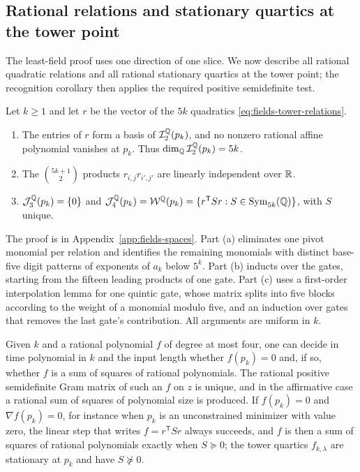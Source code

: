 \subsection{Rational relations and stationary quartics at the tower point}
\label{sec:fields-spaces}

The least-field proof uses one direction of one slice. We now describe all
rational quadratic relations and all rational stationary quartics at the
tower point; the recognition corollary then applies the required positive
semidefinite test.

\begin{theorem}
\label{thm:fields-tower-spaces}
Let $k\ge1$ and let $r$ be the vector of the $5k$ quadratics
\eqref{eq:fields-tower-relations}.
\begin{enumerate}[label=(\alph*)]
\item The entries of $r$ form a basis of $\mathcal I_2^\mathbb Q(p_k)$, and no
  nonzero rational affine polynomial vanishes at $p_k$. Thus
  $\dim_\mathbb Q\mathcal I_2^\mathbb Q(p_k)=5k$.
\item The $\binom{5k+1}2$ products $r_{i,j}r_{i',j'}$ are linearly
  independent over $\mathbb R$.
\item $\mathcal J_3^\mathbb Q(p_k)=\{0\}$ and
  $\mathcal J_4^\mathbb Q(p_k)=\mathcal W^\mathbb Q(p_k)
   =\{r^{\mathsf T}Sr:S\in\operatorname{Sym}_{5k}(\mathbb Q)\}$, with $S$ unique.
\end{enumerate}
\end{theorem}

The proof is in Appendix~\ref{app:fields-spaces}. Part (a) eliminates one
pivot monomial per relation and identifies the remaining monomials with
distinct base-five digit patterns of exponents of $a_k$ below $5^k$. Part (b)
inducts over the gates, starting from the fifteen leading products of one
gate. Part (c) uses a first-order interpolation lemma for one quintic gate,
whose matrix splits into five blocks according to the weight of a monomial
modulo five, and an induction over gates that removes the last gate's
contribution. All arguments are uniform in $k$.

\begin{corollary}
\label{cor:fields-recognition}
Given $k$ and a rational polynomial $f$ of degree at most four, one can
decide in time polynomial in $k$ and the input length whether $f(p_k)=0$
and, if so, whether $f$ is a sum of squares of rational polynomials. The
rational positive semidefinite Gram matrix of such an $f$ on $z$ is unique,
and in the affirmative case a rational sum of squares of polynomial size is
produced. If $f(p_k)=0$ and $\nabla f(p_k)=0$, for instance when $p_k$ is an
unconstrained minimizer with value zero, the linear step that writes
$f=r^{\mathsf T}Sr$ always succeeds, and $f$ is then a sum of squares of
rational polynomials exactly when $S\succeq0$; the tower quartics
$f_{k,\lambda}$ are stationary at $p_k$ and have $S\not\succeq0$.
\end{corollary}

